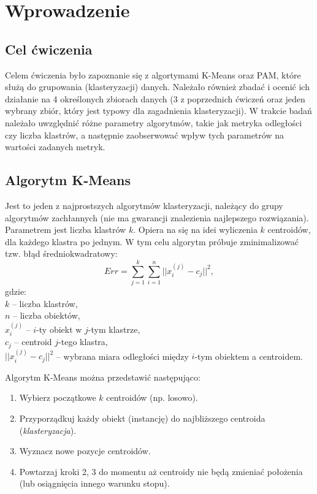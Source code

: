 \section{Wprowadzenie}
  \subsection{Cel ćwiczenia}
    Celem ćwiczenia było zapoznanie się z algortymami K-Means oraz PAM, które służą do grupowania (klasteryzacji) danych.
    Należało również zbadać i ocenić ich działanie na 4 określonych zbiorach danych (3 z poprzednich ćwiczeń oraz jeden 
    wybrany zbiór, który jest typowy dla zagadnienia klasteryzacji). W trakcie badań należało uwzględnić różne parametry
    algorytmów, takie jak metryka odległości czy liczba klastrów, a następnie zaobserwować wpływ tych parametrów na 
    wartości zadanych metryk. 

  \subsection{Algorytm K-Means}
    Jest to jeden z najprostszych algorytmów klasteryzacji, należący do grupy algorytmów zachłannych (nie ma gwarancji 
    znalezienia najlepszego rozwiązania). Parametrem jest liczba klastrów $k$. Opiera na się na idei wyliczenia $k$ centroidów,
    dla każdego klastra po jednym. W tym celu algorytm próbuje zminimalizować tzw. błąd średniokwadratowy:
    $$ Err = \sum_{j = 1}^{k} \sum_{i = 1}^{n} || x_i^{(j)} - c_j||^2,$$
    gdzie:\\
    $k$ -- liczba klastrów,\\
    $n$ -- liczba obiektów,\\
    $x_i^{(j)}$ -- $i$-ty obiekt w $j$-tym klastrze,\\
    $c_j$ -- centroid $j$-tego klastra,\\
    $||x_i^{(j)} - c_j ||^2$ -- wybrana miara odległości między $i$-tym obiektem a centroidem.\\ \vspace{1em}

    Algorytm K-Means można przedstawić następująco:
    \begin{enumerate}
      \item{Wybierz początkowe $k$ centroidów (np. losowo).}
      \item{Przyporządkuj każdy obiekt (instancję) do najbliższego centroida (\textit{klasteryzacja}).}
      \item{Wyznacz nowe pozycje centroidów.}
      \item{Powtarzaj kroki 2, 3 do momentu aż centroidy nie będą zmieniać położenia (lub osiągnięcia innego warunku stopu).}
    \end{enumerate}

